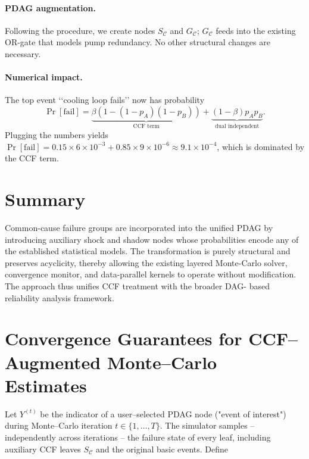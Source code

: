 \paragraph{PDAG augmentation.}  Following the procedure, we create nodes
$S_{\mathcal{C}}$ and $G_{\!\mathcal{C}}$; $G_{\!\mathcal{C}}$ feeds into the
existing OR-gate that models pump redundancy.  No other structural changes are
necessary.

\paragraph{Numerical impact.}  The top event ‘‘cooling loop fails’’ now has
probability
\[
  \Pr[\text{fail}] = \underbrace{\beta(1-(1-p_A)(1-p_B))}_{\text{CCF term}}
                      + \underbrace{(1-\beta)p_A p_B}_{\text{dual independent}}.
\]
Plugging the numbers yields
$\Pr[\text{fail}]=0.15\times 6\!\times10^{-3} + 0.85\times 9\!\times10^{-6}
  \approx 9.1\times10^{-4}$, which is dominated by the CCF term.

\section{Summary}

Common-cause failure groups are incorporated into the unified PDAG by
introducing auxiliary shock and shadow nodes whose probabilities encode any of
the established statistical models.  The transformation is purely structural
and preserves acyclicity, thereby allowing the existing layered Monte-Carlo
solver, convergence monitor, and data-parallel kernels to operate without
modification.  The approach thus unifies CCF treatment with the broader DAG-
based reliability analysis framework.


\section{Convergence Guarantees for CCF--Augmented Monte--Carlo Estimates}
\label{sec:ccf_convergence}

Let $Y^{(t)}$ be the indicator of a user--selected PDAG node ("event of
interest") during Monte--Carlo iteration $t\in\{1,\dots,T\}$.  The simulator
samples – 
independently across iterations – the failure state of every leaf, including
auxiliary CCF leaves $S_{\mathcal{C}}$ and the original basic events.  Define

